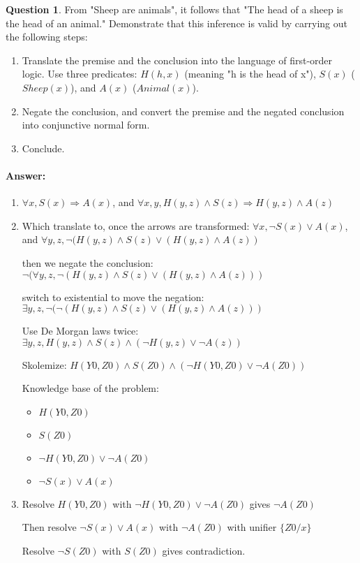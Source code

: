 \documentclass[11pt,a4paper]{article}
\theoremstyle{definition}%
\newtheorem{Q}{Question}[] %
\newcommand{\reponse}[1]{%
\ifthenelse {\boolean{corrige}} {\paragraph{Answer:} \color{darkblue}   #1\color{black}} {}
}
\begin{document}
\begin{Q}
From "Sheep are animals", it follows that "The head of a sheep is the
head of an animal." Demonstrate that this inference is valid by
carrying out the following steps:
\begin{enumerate}
    \item Translate the premise and the conclusion into the language of first-order logic. Use three predicates: $H(h,x)$ (meaning "h is the head of x"), $S(x)$ ($Sheep(x)$), and $A(x)$ ($Animal(x)$).
    \item Negate the conclusion, and convert the premise and the negated conclusion into conjunctive normal form.
    \item Conclude.
\end{enumerate}

\reponse {

\begin{enumerate}
    \item $\forall x, S(x) \Rightarrow A(x)$, and $\forall x,y, H(y,z) \wedge S(z) \Rightarrow H(y,z) \wedge A(z)$

    \item Which translate to, once the arrows are transformed:
        $\forall x, \neg S(x) \vee A(x)$, and $\forall y,z, \neg (H(y,z) \wedge S(z) \vee (H(y,z) \wedge A(z) )$

        then we negate the conclusion:
        $\neg (\forall y,z, \neg (H(y,z) \wedge S(z) \vee (H(y,z) \wedge A(z) ))$
        
        switch to existential to move the negation:
        $\exists y,z,\neg( \neg (H(y,z) \wedge S(z) \vee (H(y,z) \wedge A(z) ))$
        
        Use De Morgan laws twice:
        $\exists y,z, H(y,z) \wedge S(z) \wedge (\neg H(y,z) \vee \neg A(z) )$

        Skolemize:
        $H(Y0,Z0) \wedge S(Z0) \wedge (\neg H(Y0,Z0) \vee \neg A(Z0))$

        Knowledge base of the problem:
        \begin{itemize}
            \item $H(Y0,Z0)$
            \item $S(Z0)$
            \item $\neg H(Y0,Z0) \vee \neg A(Z0) $
            \item $\neg S(x)  \vee A(x)$

        \end{itemize}

    \item Resolve $H(Y0,Z0)$ with $\neg H(Y0,Z0) \vee \neg A(Z0) $ gives $\neg A(Z0)$ 

        Then resolve $\neg S(x)  \vee A(x)$ with $\neg A(Z0)$ with unifier $\{ Z0/x \}$

        Resolve $\neg S(Z0)$ with $S(Z0)$ gives contradiction.






\end{enumerate}

}
\end{Q}
\end{document}
